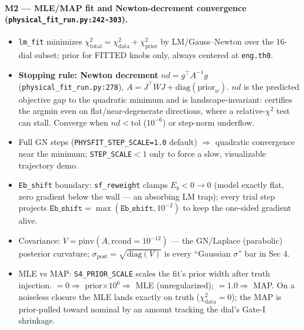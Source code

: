 \documentclass[aps,prd,reprint,superscriptaddress,nofootinbib,amsmath,amssymb,floatfix]{revtex4-1}
\begin{document}
\paragraph{M2 --- MLE/MAP fit and Newton-decrement convergence (\texttt{physical\_fit\_run.py:242-303}).}
\begin{itemize}
  \item \texttt{lm\_fit} minimizes $\chi^2_\mathrm{total}=\chi^2_\mathrm{data}+\chi^2_\mathrm{prior}$ by
        LM/Gauss--Newton over the 16-dial subset; prior for FITTED knobs only, always centered at
        \texttt{eng.th0}.
  \item \textbf{Stopping rule: Newton decrement} $nd=g^\top A^{-1}g$ (\texttt{physical\_fit\_run.py:278}),
        $A=J^\top W J+\mathrm{diag}(\mathrm{prior}_w)$. $nd$ is the predicted objective gap to the
        quadratic minimum and is landscape-invariant: certifies the argmin even on flat/near-degenerate
        directions, where a relative-$\chi^2$ test can stall. Converge when $nd<\mathrm{tol}$ ($10^{-6}$)
        or step-norm underflow.
  \item Full GN steps (\texttt{PHYSFIT\_STEP\_SCALE=1.0} default) $\Rightarrow$ quadratic convergence
        near the minimum; \texttt{STEP\_SCALE}$<1$ only to force a slow, visualizable trajectory demo.
  \item \texttt{Eb\_shift} boundary: \texttt{sf\_reweight} clamps $E_b<0\rightarrow0$ (model exactly flat,
        zero gradient below the wall --- an absorbing LM trap); every trial step projects
        $\texttt{Eb\_shift}=\max(\texttt{Eb\_shift},10^{-2})$ to keep the one-sided gradient alive.
  \item Covariance: $V=\mathrm{pinv}(A,\mathrm{rcond}=10^{-12})$ --- the GN/Laplace (parabolic) posterior
        curvature; $\sigma_\mathrm{post}=\sqrt{\mathrm{diag}(V)}$ is every ``Gaussian $\sigma$'' bar in Sec 4.
  \item MLE vs MAP: \texttt{S4\_PRIOR\_SCALE} scales the fit's prior width after truth injection.
        $=0\Rightarrow$ prior$\times10^6\Rightarrow$ MLE (unregularized); $=1.0\Rightarrow$ MAP. On a
        noiseless closure the MLE lands exactly on truth ($\chi^2_\mathrm{data}=0$); the MAP is prior-pulled
        toward nominal by an amount tracking the dial's Gate-I shrinkage.
\end{itemize}
\end{document}
